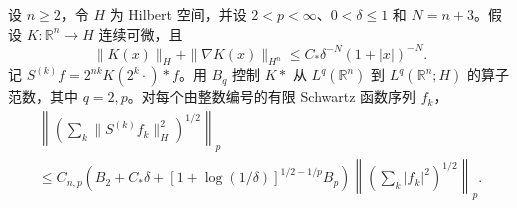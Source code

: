 设 $n\ge2$，令 $H$ 为 Hilbert 空间，并设 $2<p<\infty$、$0<\delta\le1$ 和 $N=n+3$。假设 $K:\mathbb R^n\to H$ 连续可微，且
\[
 \|K(x)\|_H+\|\nabla K(x)\|_{H^n}\le C_*\delta^{-N}(1+|x|)^{-N}.
\]
记 $S^{(k)}f=2^{nk}K(2^k\cdot)*f$。用 $B_q$ 控制 $K*$ 从 $L^q(\mathbb R^n)$ 到 $L^q(\mathbb R^n;H)$ 的算子范数，其中 $q=2,p$。对每个由整数编号的有限 Schwartz 函数序列 $f_k$，
\[
\begin{gathered}
 \left\|\left(\sum_k\|S^{(k)}f_k\|_H^2\right)^{1/2}\right\|_p \\
 \le C_{n,p}\left(B_2+C_*\delta+
 [1+\log(1/\delta)]^{1/2-1/p}B_p\right)
 \left\|\left(\sum_k|f_k|^2\right)^{1/2}\right\|_p.
\end{gathered}
\]
